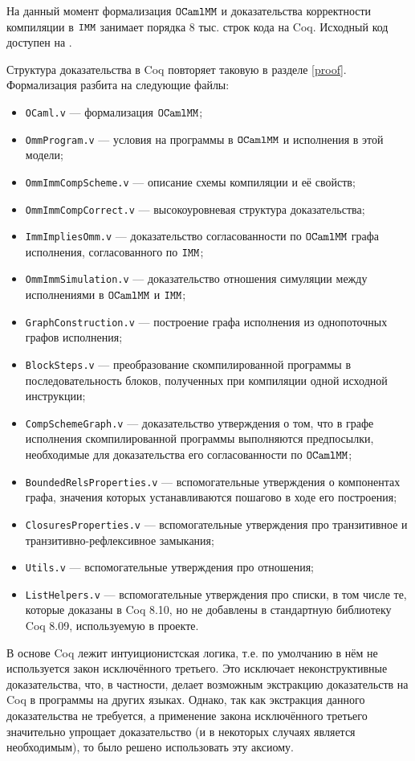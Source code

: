На данный момент формализация $\mathtt{OCaml}\allowbreak \mathtt{MM}$ и доказательства корректности компиляции в $\mathtt{IMM}$ занимает порядка 8 тыс. строк кода на Coq. Исходный код доступен на \cite{imm-repo}.

Структура доказательства в Coq повторяет таковую в разделе \ref{proof}. Формализация разбита на следующие файлы:

\begin{itemize}
\item \verb|OCaml.v| --- формализация $\mathtt{OCaml}\allowbreak \mathtt{MM}$;
\item \verb|OmmProgram.v| --- условия на программы в $\mathtt{OCaml}\allowbreak \mathtt{MM}$ и исполнения в этой модели;  
\item \verb|OmmImmCompScheme.v| --- описание схемы компиляции и её свойств;
\item \verb|OmmImmCompCorrect.v| --- высокоуровневая структура доказательства;
\item \verb|ImmImpliesOmm.v| --- доказательство согласованности по $\mathtt{OCaml}\allowbreak \mathtt{MM}$ графа исполнения, согласованного по $\mathtt{IMM}$;  
\item \verb|OmmImmSimulation.v| --- доказательство отношения симуляции между исполнениями в $\mathtt{OCaml}\allowbreak \mathtt{MM}$ и $\mathtt{IMM}$;
\item \verb|GraphConstruction.v| --- построение графа исполнения из однопоточных графов исполнения;
\item \verb|BlockSteps.v| --- преобразование скомпилированной программы в последовательность блоков, полученных при компиляции одной исходной инструкции;
\item \verb|CompSchemeGraph.v| --- доказательство утверждения о том, что в графе исполнения скомпилированной программы выполняются предпосылки, необходимые для доказательства его согласованности по $\mathtt{OCaml}\allowbreak \mathtt{MM}$;
\item \verb|BoundedRelsProperties.v| --- вспомогательные утверждения о компонентах графа, значения которых устанавливаются пошагово в ходе его построения;
\item \verb|ClosuresProperties.v| --- вспомогательные утверждения про транзитивное и транзитивно-рефлексивное замыкания;
\item \verb|Utils.v| --- вспомогательные утверждения про отношения;
\item \verb|ListHelpers.v| --- вспомогательные утверждения про списки, в том числе те, которые доказаны в Coq 8.10, но не добавлены в стандартную библиотеку Coq 8.09, используемую в проекте.
\end{itemize}

В основе Coq лежит интуиционистская логика, т.е. по умолчанию в нём не используется закон исключённого третьего. Это исключает неконструктивные доказательства, что, в частности, делает возможным экстракцию доказательств на Coq в программы на других языках. Однако, так как экстракция данного доказательства не требуется, а применение закона исключённого третьего значительно упрощает доказательство (и в некоторых случаях является необходимым), то было решено использовать эту аксиому.

